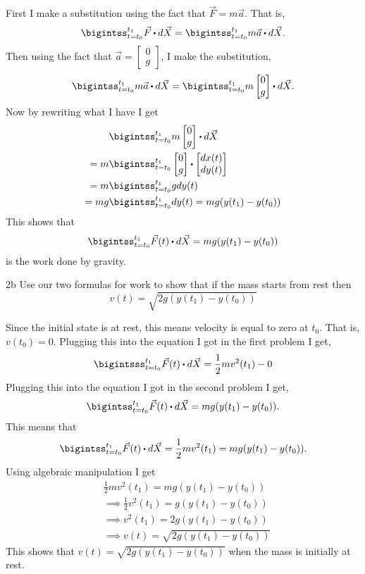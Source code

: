 \documentclass[titlepage]{article}
\begin{document}
\begin{solution}
First I make a substitution using the fact that $\vec{F} = m\vec{a}$. That is,
 $$\bigintss_{t=t_0}^{t_1} \vec{F} \bigcdot d\vec{X} = \bigintss_{t=t_0}^{t_1} m\vec{a} \bigcdot d\vec{X}.$$
Then using the fact that $\vec{a} = \begin{bmatrix} 0 \\ g \end{bmatrix}$, I make the substitution,
$$  \bigintss_{t=t_0}^{t_1} m\vec{a} \bigcdot d\vec{X} =\bigintss_{t=t_0}^{t_1} m \begin{bmatrix} 0 \\ g \end{bmatrix} \bigcdot d\vec{X}.$$
Now by rewriting what I have I get 
\begin{align*}
&\bigintss_{t=t_0}^{t_1} m \begin{bmatrix} 0 \\ g \end{bmatrix} \bigcdot d\vec{X}\\
= m &\bigintss_{t=t_0}^{t_1}  \begin{bmatrix} 0 \\ g \end{bmatrix} \bigcdot \begin{bmatrix} dx(t) \\ dy(t) \end{bmatrix} \\
= m &\bigintss_{t=t_0}^{t_1} gdy(t) \\
= mg&\bigintss_{t=t_0}^{t_1} dy(t) = mg(y(t_1) - y(t_0)) 
\end{align*}
This shows that
$$\bigintss_{t=t_0}^{t_1} \vec{F}(t) \bigcdot d\vec{X} = mg(y(t_1)-y(t_0))$$
is the work done by gravity.
\end{solution}

\begin{problem}{2b}
Use our two formulas for work to show that if the mass starts from rest then
$$v(t) = \sqrt{2g(y(t_1) - y(t_0))} $$
\end{problem}
\begin{solution}
Since the initial state is at rest, this means velocity is equal to zero at $t_0$. That is, $v(t_0) = 0$. Plugging this into the equation I got in the first problem I get,
$$\bigintsss_{t=t_0}^{t_1} \vec{F}(t) \bigcdot d\vec{X} = \frac{1}{2}mv^2(t_1) - 0$$
Plugging this into the equation I got in the second problem I get,
$$\bigintss_{t=t_0}^{t_1} \vec{F}(t) \bigcdot d\vec{X} = mg(y(t_1)-y(t_0)). $$
This means that
$$\bigintss_{t=t_0}^{t_1} \vec{F}(t) \bigcdot d\vec{X} = \frac{1}{2}mv^2(t_1) = mg(y(t_1)-y(t_0)).$$
Using algebraic manipulation I get
\begin{align*}
 &\frac{1}{2}mv^2(t_1) = mg(y(t_1)-y(t_0)) \\
 &\implies \frac{1}{2}v^2(t_1) = g(y(t_1)-y(t_0)) \\ 
 &\implies v^2(t_1) =2g(y(t_1) - y(t_0)) \\
 &\implies v(t) = \sqrt{2g(y(t_1) - y(t_0))}
 \end{align*}
 This shows that $v(t) = \sqrt{2g(y(t_1) - y(t_0))}$ when the mass is initially at rest.
\end{solution}
\end{document}
